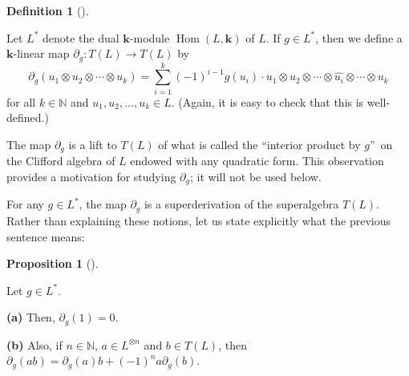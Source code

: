 \documentclass[numbers=enddot,12pt,final,onecolumn,notitlepage]{scrartcl}%
\theoremstyle{definition}
\newtheorem{prop}[theo]{Proposition}
\newenvironment{proposition}[1][]
{\begin{prop}[#1]\begin{leftbar}}
{\end{leftbar}\end{prop}}
\newtheorem{defi}[theo]{Definition}
\newenvironment{definition}[1][]
{\begin{defi}[#1]\begin{leftbar}}
{\end{leftbar}\end{defi}}
\let\sumnonlimits\sum
\renewcommand{\sum}{\sumnonlimits\limits}
\begin{document}
\begin{definition}
\label{def.deltag}Let $L^{\ast}$ denote the dual $\mathbf{k}$-module
$\operatorname*{Hom}\left(  L,\mathbf{k}\right)  $ of $L$. If $g\in L^{\ast}$,
then we define a $\mathbf{k}$-linear map $\partial_{g}:T\left(  L\right)
\rightarrow T\left(  L\right)  $ by%
\[
\partial_{g}\left(  u_{1}\otimes u_{2}\otimes\cdots\otimes u_{k}\right)
=\sum_{i=1}^{k}\left(  -1\right)  ^{i-1}g\left(  u_{i}\right)  \cdot
u_{1}\otimes u_{2}\otimes\cdots\otimes\widehat{u_{i}}\otimes\cdots\otimes
u_{k}%
\]
for all $k\in\mathbb{N}$ and $u_{1},u_{2},\ldots,u_{k}\in L$. (Again, it is
easy to check that this is well-defined.)
\end{definition}

The map $\partial_{g}$ is a lift to $T\left(  L\right)  $ of what is called
the \textquotedblleft interior product by $g$\textquotedblright\ on the
Clifford algebra of $L$ endowed with any quadratic form. This observation
provides a motivation for studying $\partial_{g}$; it will not be used below.

For any $g\in L^{\ast}$, the map $\partial_{g}$ is a superderivation of the
superalgebra $T\left(  L\right)  $. Rather than explaining these notions, let
us state explicitly what the previous sentence means:

\begin{proposition}
\label{prop.1}Let $g\in L^{\ast}$. \medskip

\textbf{(a)} Then, $\partial_{g}\left(  1\right)  =0$. \medskip

\textbf{(b)} Also, if $n\in\mathbb{N}$, $a\in L^{\otimes n}$ and $b\in
T\left(  L\right)  $, then $\partial_{g}\left(  ab\right)  =\partial
_{g}\left(  a\right)  b+\left(  -1\right)  ^{n}a\partial_{g}\left(  b\right)
$.
\end{proposition}
\end{document}
